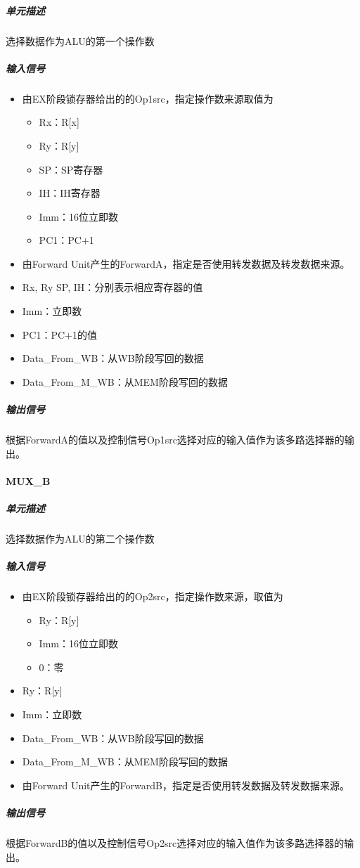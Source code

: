 \documentclass{article}
\begin{document}
\subparagraph{单元描述}
选择数据作为ALU的第一个操作数

\subparagraph{输入信号}
	
\begin{itemize}
	\item 由EX阶段锁存器给出的的Op1src，指定操作数来源取值为
		\begin{itemize}
			\item Rx：R[x]
			\item Ry：R[y]
			\item SP：SP寄存器
			\item IH：IH寄存器
			\item Imm：16位立即数
			\item PC1：PC+1
		\end{itemize}
	\item 由Forward Unit产生的ForwardA，指定是否使用转发数据及转发数据来源。
	\item Rx, Ry SP, IH：分别表示相应寄存器的值
	\item Imm：立即数
	\item PC1：PC+1的值
	\item Data\_From\_WB：从WB阶段写回的数据
	\item Data\_From\_M\_WB：从MEM阶段写回的数据
\end{itemize}

\subparagraph{输出信号}
根据ForwardA的值以及控制信号Op1src选择对应的输入值作为该多路选择器的输出。
	
\paragraph{MUX\_B}
	
\subparagraph{单元描述}
选择数据作为ALU的第二个操作数
	
\subparagraph{输入信号}
\begin{itemize}
\item 由EX阶段锁存器给出的的Op2src，指定操作数来源，取值为
\begin{itemize}
\item Ry：R[y]
\item Imm：16位立即数
\item 0：零
\end{itemize}
\item Ry：R[y]
\item Imm：立即数
\item Data\_From\_WB：从WB阶段写回的数据
\item Data\_From\_M\_WB：从MEM阶段写回的数据
\item 由Forward Unit产生的ForwardB，指定是否使用转发数据及转发数据来源。
\end{itemize}
\subparagraph{输出信号}
根据ForwardB的值以及控制信号Op2src选择对应的输入值作为该多路选择器的输出。
\end{document}
